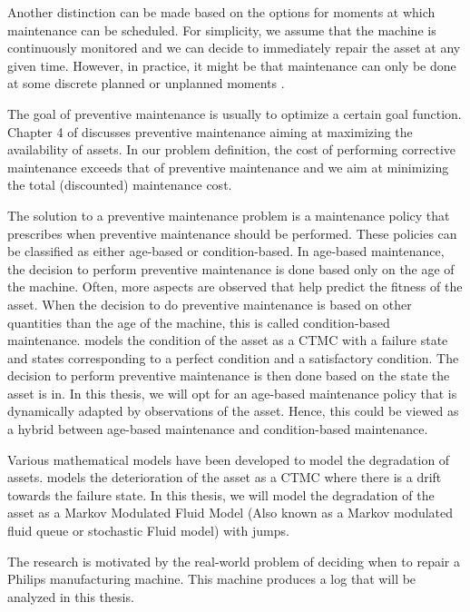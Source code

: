 \documentclass[a4paper]{thesis}
\theoremstyle{definition}
\begin{document}
	Another distinction can be made based on the options for moments at which maintenance can be scheduled.
	For simplicity, we assume that the machine is continuously monitored and we can decide to immediately repair the asset at any given time.
	However, in practice, it might be that maintenance can only be done at some discrete planned or unplanned moments \cite{Kalosi2016}.
	
	The goal of preventive maintenance is usually to optimize a certain goal function.
	Chapter 4 of \cite{Zacks2012} discusses preventive maintenance aiming at maximizing the availability of assets.
	In our problem definition, the cost of performing corrective maintenance exceeds that of preventive maintenance and we aim at minimizing the total (discounted) maintenance cost.
	
	The solution to a preventive maintenance problem is a maintenance policy that prescribes when preventive maintenance should be performed.
	These policies can be classified as either age-based or condition-based.
	In age-based maintenance, the decision to perform preventive maintenance is done based only on the age of the machine.
	Often, more aspects are observed that help predict the fitness of the asset.
	When the decision to do preventive maintenance is based on other quantities than the age of the machine, this is called condition-based maintenance.
	\cite{Kalosi2016} models the condition of the asset as a CTMC with a failure state and states corresponding to a perfect condition and a satisfactory condition.
	The decision to perform preventive maintenance is then done based on the state the asset is in.
	In this thesis, we will opt for an age-based maintenance policy that is dynamically adapted by observations of the asset.
	Hence, this could be viewed as a hybrid between age-based maintenance and condition-based maintenance.
	
	Various mathematical models have been developed to model the degradation of assets.
	\cite{Derman1963} models the deterioration of the asset as a CTMC where there is a drift towards the failure state.
	In this thesis, we will model the degradation of the asset as a Markov Modulated Fluid Model (Also known as a Markov modulated fluid queue or stochastic Fluid model) with jumps.
	
	The research is motivated by the real-world problem of deciding when to repair a Philips manufacturing machine.
	This machine produces a log that will be analyzed in this thesis.
	
\end{document}

